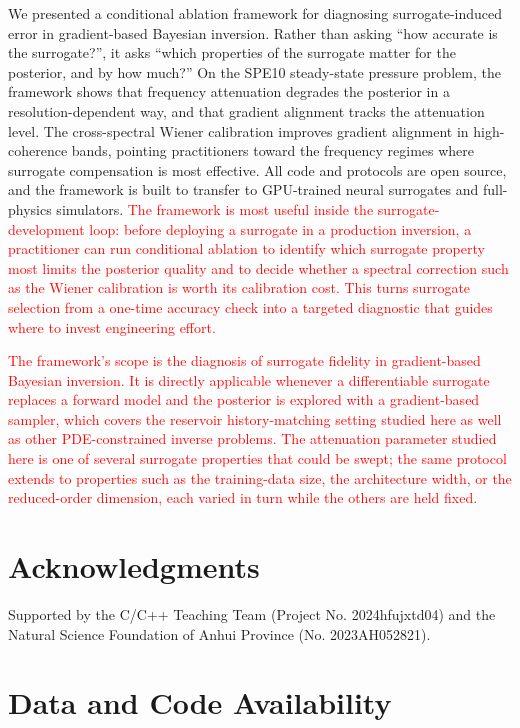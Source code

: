 \documentclass[12pt]{article}
\newcommand{\add}[1]{\textcolor{red}{#1}}
\begin{document}
We presented a conditional ablation framework for diagnosing surrogate-induced error in gradient-based Bayesian inversion. Rather than asking ``how accurate is the surrogate?'', it asks ``which properties of the surrogate matter for the posterior, and by how much?'' On the SPE10 steady-state pressure problem, the framework shows that frequency attenuation degrades the posterior in a resolution-dependent way, and that gradient alignment tracks the attenuation level. The cross-spectral Wiener calibration improves gradient alignment in high-coherence bands, pointing practitioners toward the frequency regimes where surrogate compensation is most effective. All code and protocols are open source, and the framework is built to transfer to GPU-trained neural surrogates and full-physics simulators. \add{The framework is most useful inside the surrogate-development loop: before deploying a surrogate in a production inversion, a practitioner can run conditional ablation to identify which surrogate property most limits the posterior quality and to decide whether a spectral correction such as the Wiener calibration is worth its calibration cost. This turns surrogate selection from a one-time accuracy check into a targeted diagnostic that guides where to invest engineering effort.}

\add{The framework's scope is the diagnosis of surrogate fidelity in gradient-based Bayesian inversion. It is directly applicable whenever a differentiable surrogate replaces a forward model and the posterior is explored with a gradient-based sampler, which covers the reservoir history-matching setting studied here as well as other PDE-constrained inverse problems. The attenuation parameter studied here is one of several surrogate properties that could be swept; the same protocol extends to properties such as the training-data size, the architecture width, or the reduced-order dimension, each varied in turn while the others are held fixed.}

\section*{Acknowledgments}

Supported by the C/C++ Teaching Team (Project No. 2024hfujxtd04) and the Natural Science Foundation of Anhui Province (No. 2023AH052821).

\section*{Data and Code Availability}
\end{document}
